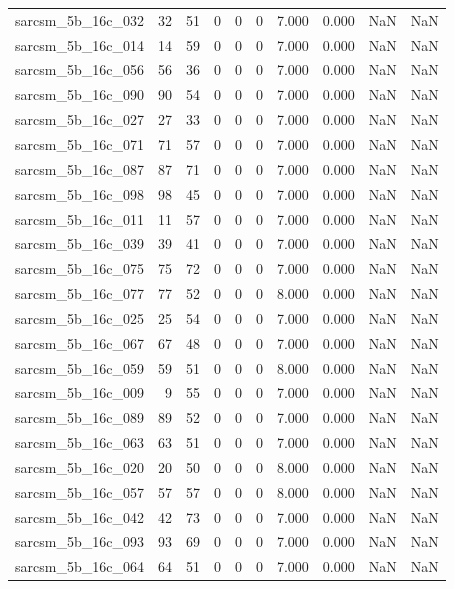 \documentclass{article}
\begin{document}
\begin{longtable}{lrrrrrrrrr}
sarcsm\_5b\_16c\_032 & 32 & 51 & 0 & 0 & 0 & 7.000 & 0.000 & NaN & NaN \\
sarcsm\_5b\_16c\_014 & 14 & 59 & 0 & 0 & 0 & 7.000 & 0.000 & NaN & NaN \\
sarcsm\_5b\_16c\_056 & 56 & 36 & 0 & 0 & 0 & 7.000 & 0.000 & NaN & NaN \\
sarcsm\_5b\_16c\_090 & 90 & 54 & 0 & 0 & 0 & 7.000 & 0.000 & NaN & NaN \\
sarcsm\_5b\_16c\_027 & 27 & 33 & 0 & 0 & 0 & 7.000 & 0.000 & NaN & NaN \\
sarcsm\_5b\_16c\_071 & 71 & 57 & 0 & 0 & 0 & 7.000 & 0.000 & NaN & NaN \\
sarcsm\_5b\_16c\_087 & 87 & 71 & 0 & 0 & 0 & 7.000 & 0.000 & NaN & NaN \\
sarcsm\_5b\_16c\_098 & 98 & 45 & 0 & 0 & 0 & 7.000 & 0.000 & NaN & NaN \\
sarcsm\_5b\_16c\_011 & 11 & 57 & 0 & 0 & 0 & 7.000 & 0.000 & NaN & NaN \\
sarcsm\_5b\_16c\_039 & 39 & 41 & 0 & 0 & 0 & 7.000 & 0.000 & NaN & NaN \\
sarcsm\_5b\_16c\_075 & 75 & 72 & 0 & 0 & 0 & 7.000 & 0.000 & NaN & NaN \\
sarcsm\_5b\_16c\_077 & 77 & 52 & 0 & 0 & 0 & 8.000 & 0.000 & NaN & NaN \\
sarcsm\_5b\_16c\_025 & 25 & 54 & 0 & 0 & 0 & 7.000 & 0.000 & NaN & NaN \\
sarcsm\_5b\_16c\_067 & 67 & 48 & 0 & 0 & 0 & 7.000 & 0.000 & NaN & NaN \\
sarcsm\_5b\_16c\_059 & 59 & 51 & 0 & 0 & 0 & 8.000 & 0.000 & NaN & NaN \\
sarcsm\_5b\_16c\_009 & 9 & 55 & 0 & 0 & 0 & 7.000 & 0.000 & NaN & NaN \\
sarcsm\_5b\_16c\_089 & 89 & 52 & 0 & 0 & 0 & 7.000 & 0.000 & NaN & NaN \\
sarcsm\_5b\_16c\_063 & 63 & 51 & 0 & 0 & 0 & 7.000 & 0.000 & NaN & NaN \\
sarcsm\_5b\_16c\_020 & 20 & 50 & 0 & 0 & 0 & 8.000 & 0.000 & NaN & NaN \\
sarcsm\_5b\_16c\_057 & 57 & 57 & 0 & 0 & 0 & 8.000 & 0.000 & NaN & NaN \\
sarcsm\_5b\_16c\_042 & 42 & 73 & 0 & 0 & 0 & 7.000 & 0.000 & NaN & NaN \\
sarcsm\_5b\_16c\_093 & 93 & 69 & 0 & 0 & 0 & 7.000 & 0.000 & NaN & NaN \\
sarcsm\_5b\_16c\_064 & 64 & 51 & 0 & 0 & 0 & 7.000 & 0.000 & NaN & NaN \\

\end{longtable}
\end{document}
